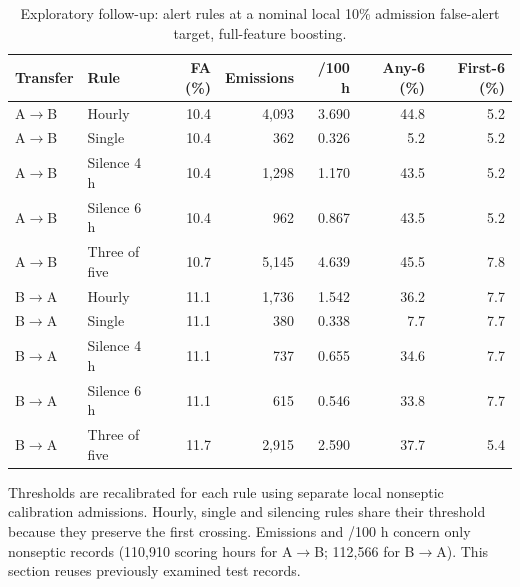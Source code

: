 \begin{table}[htbp]\centering\small
\caption{Exploratory follow-up: alert rules at a nominal local 10\% admission false-alert target, full-feature boosting.}\label{tab:policies}
\begin{tabular}{llrrrrr}\toprule
Transfer & Rule & FA (\%) & Emissions & /100 h & Any-6 (\%) & First-6 (\%) \\\midrule
A$\to$B & Hourly & 10.4 & 4,093 & 3.690 & 44.8 & 5.2 \\
A$\to$B & Single & 10.4 & 362 & 0.326 & 5.2 & 5.2 \\
A$\to$B & Silence 4 h & 10.4 & 1,298 & 1.170 & 43.5 & 5.2 \\
A$\to$B & Silence 6 h & 10.4 & 962 & 0.867 & 43.5 & 5.2 \\
A$\to$B & Three of five & 10.7 & 5,145 & 4.639 & 45.5 & 7.8 \\
B$\to$A & Hourly & 11.1 & 1,736 & 1.542 & 36.2 & 7.7 \\
B$\to$A & Single & 11.1 & 380 & 0.338 & 7.7 & 7.7 \\
B$\to$A & Silence 4 h & 11.1 & 737 & 0.655 & 34.6 & 7.7 \\
B$\to$A & Silence 6 h & 11.1 & 615 & 0.546 & 33.8 & 7.7 \\
B$\to$A & Three of five & 11.7 & 2,915 & 2.590 & 37.7 & 5.4 \\
\bottomrule\end{tabular}
\par\vspace{3pt}\begin{minipage}{.98\linewidth}\footnotesize Thresholds are recalibrated for each rule using separate local nonseptic calibration admissions. Hourly, single and silencing rules share their threshold because they preserve the first crossing. Emissions and /100 h concern only nonseptic records (110,910 scoring hours for A$\to$B; 112,566 for B$\to$A). This section reuses previously examined test records.\end{minipage}
\end{table}
